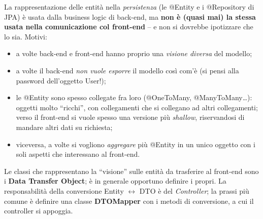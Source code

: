 La rappresentazione delle entit\`a nella \emph{persistenza} (le @Entity e i @Repository di
JPA) \`e usata dalla business logic di back-end, ma \textbf{non \`e (quasi mai) la stessa
usata nella comunicazione col front-end} -- e non si dovrebbe ipotizzare che lo sia. Motivi:
\begin{itemize}
  \item a volte back-end e front-end hanno proprio una \emph{visione diversa} del modello;
  \item a volte il back-end \emph{non vuole esporre} il modello cos\`i com'\`e (si pensi alla
        password dell'oggetto User!);
  \item le @Entity sono spesso collegate fra loro (@OneToMany, @ManyToMany\dots): oggetti
        molto ``ricchi'', con collegamenti che si collegano ad altri collegamenti; verso il
        front-end si vuole spesso una versione pi\`u \emph{shallow}, riservandosi di mandare
        altri dati su richiesta;
  \item viceversa, a volte si vogliono \emph{aggregare} pi\`u @Entity in un unico oggetto con
        i soli aspetti che interessano al front-end.
\end{itemize}
\begin{definizione}[DTO]
Le classi che rappresentano la ``visione'' sulle entit\`a da trasferire al front-end sono i
\textbf{Data Transfer Object}; \`e in generale opportuno definire i propri. La
responsabilit\`a della conversione Entity $\leftrightarrow$ DTO \`e del \emph{Controller};
la prassi pi\`u comune \`e definire una classe \textbf{DTOMapper} con i metodi di
conversione, a cui il controller si appoggia.
\end{definizione}
